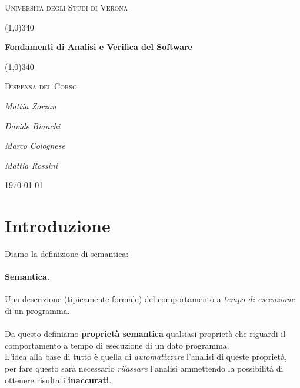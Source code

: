 \documentclass{article}
\begin{document}
    \clearpage

    \begin{titlepage}
        \centering
        \vspace*{\fill}
        {\scshape\LARGE Università degli Studi di Verona \par}
        \vspace{1.5cm}
        \line(1,0){340} \\
        {\huge\bfseries Fondamenti di Analisi e Verifica del Software \par}
        \line(1,0){340} \\
        \vspace{0.5cm}
        {\scshape\LARGE Dispensa del Corso \par}
        \vspace{2cm}
        {\Large\itshape Mattia Zorzan \par}
        {\Large\itshape Davide Bianchi \par}
        {\Large\itshape Marco Colognese \par}
        {\Large\itshape Mattia Rossini \par}
        \vspace{1cm}

        \vspace{5cm}
        \vspace*{\fill}
        {\large \today \par}
    \end{titlepage}
    \thispagestyle{empty}
    \newpage
    \tableofcontents
    \thispagestyle{empty}
    \newpage

    \section{Introduzione}
        Diamo la definizione di semantica:
        \paragraph{Semantica.} Una descrizione (tipicamente formale) del comportamento a \textit{tempo di esecuzione} di un programma.\\
        \\   
        Da questo definiamo \textbf{proprietà semantica} qualsiasi proprietà che riguardi il comportamento a tempo di esecuzione di un dato programma.\\
        L'idea alla base di tutto è quella di \textit{automatizzare} l'analisi di queste proprietà, per fare questo sarà necessario \textit{rilassare} l'analisi ammettendo la possibilità di ottenere risultati \textbf{inaccurati}. 
\end{document}
